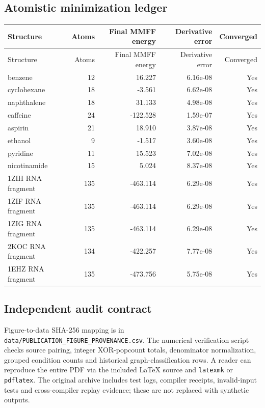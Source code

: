 \documentclass[10pt,a4paper]{article}
\begin{document}
\subsection{Atomistic minimization ledger}
\begin{center}\scriptsize\begin{longtable}{lrrrr}
\toprule
Structure & Atoms & Final MMFF energy & Derivative error & Converged\\
\midrule
\endfirsthead
\toprule
Structure & Atoms & Final MMFF energy & Derivative error & Converged\\
\midrule
\endhead
benzene & 12 & 16.227 & 6.16e-08 & Yes\\
cyclohexane & 18 & -3.561 & 6.62e-08 & Yes\\
naphthalene & 18 & 31.133 & 4.98e-08 & Yes\\
caffeine & 24 & -122.528 & 1.59e-07 & Yes\\
aspirin & 21 & 18.910 & 3.87e-08 & Yes\\
ethanol & 9 & -1.517 & 3.60e-08 & Yes\\
pyridine & 11 & 15.523 & 7.02e-08 & Yes\\
nicotinamide & 15 & 5.024 & 8.37e-08 & Yes\\
1ZIH RNA fragment & 135 & -463.114 & 6.29e-08 & Yes\\
1ZIF RNA fragment & 135 & -463.114 & 6.29e-08 & Yes\\
1ZIG RNA fragment & 135 & -463.114 & 6.29e-08 & Yes\\
2KOC RNA fragment & 134 & -422.257 & 7.77e-08 & Yes\\
1EHZ RNA fragment & 135 & -473.756 & 5.75e-08 & Yes\\
\bottomrule
\end{longtable}
\end{center}
\subsection{Independent audit contract}
Figure-to-data SHA-256 mapping is in \texttt{data/PUBLICATION\_FIGURE\_PROVENANCE.csv}. The numerical verification script checks source pairing, integer XOR-popcount totals, denominator normalization, grouped condition counts and historical graph-classification rows. A reader can reproduce the entire PDF via the included LaTeX source and \texttt{latexmk} or \texttt{pdflatex}. The original archive includes test logs, compiler receipts, invalid-input tests and cross-compiler replay evidence; these are not replaced with synthetic outputs.
\end{document}
